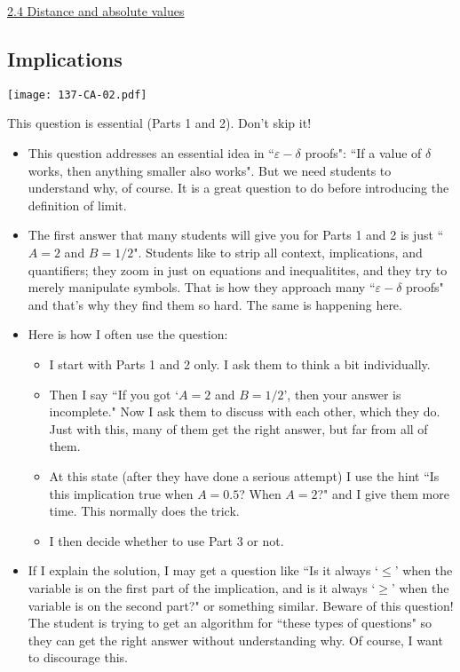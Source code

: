 \documentclass[11pt]{article}
\newcommand{\n}{\newpage}
\newcommand{\e}{\varepsilon}
\newcommand{\nl}{\hfill \vspace{-1.1\baselineskip}} %
\newcommand{\viv}{\hspace{8mm} \href{https://www.youtube.com/watch?v=6wFC38rVMbk&list=PLlwePzQY_wW8P_I8BFgm0-upywEwTKd8_&index=4}{2.4 Distance and absolute values}}
\begin{document}
\begin{videos}
\viv
\end{videos}

\n
\newpage
\subsection{Implications} 

\begin{center}
{ \texttt{[image: 137-CA-02.pdf]}}
\end{center}

\begin{warning}
	This question is essential (Parts 1 and 2).  Don't skip it!
\end{warning}
\begin{comments}
\nl
	\begin{itemize}
		\item This question addresses an essential idea in ``$\e-\delta$ proofs": ``If a value of $\delta$ works, then anything smaller also works".  But we need students to understand why, of course.  It is a great question to do before introducing the definition of limit.
		\item  The first answer that many students will give you for Parts 1 and 2 is just ``$A=2$ and $B=1/2$".   Students like to strip all context, implications, and quantifiers; they zoom in just on equations and inequalitites, and they try to merely manipulate symbols.  That is how they approach many ``$\e-\delta$ proofs" and that's why they find them so hard.  The same is happening here.
		\item  Here is how I often use the question:
			\begin{itemize}
				\item I start with Parts 1 and 2 only.  I ask them to think a bit individually.  
				\item Then I say ``If you got `$A=2$ and $B=1/2$', then your answer is incomplete."  Now I ask them to discuss with each other, which they do.  Just with this, many of them get the right answer, but far from all of them.   
				\item  At this state (after they have done a serious attempt) I use the hint  ``Is this implication true when $A=0.5$?  When $A=2$?"  and I give them more time.  This normally does the trick.
				\item I then decide whether to use Part 3 or not.
			\end{itemize}
		\item If I explain the solution, I may get a question like ``Is it always `$\leq$' when the variable is on the first part of the implication, and is it always `$\geq$' when the variable is on the second part?"  or something similar.  Beware of this question!   The student is trying to get an algorithm for ``these types of questions" so they can get the right answer without understanding why.   Of course, I want to discourage this.
	\end{itemize}
\end{comments}
\end{document}
